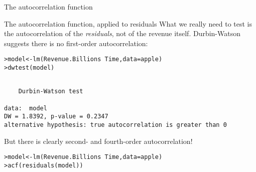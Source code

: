 \documentclass{beamer}\usepackage[]{graphicx}\usepackage[]{color}
\makeatletter
\newcommand{\hlopt}[1]{\textcolor[rgb]{1,0.894,0.769}{#1}}%
\newcommand{\hlstd}[1]{\textcolor[rgb]{1,0.894,0.769}{#1}}%
\newcommand{\hlkwb}[1]{\textcolor[rgb]{0.804,0.776,0.451}{#1}}%
\newcommand{\hlkwc}[1]{\textcolor[rgb]{0.78,0.941,0.545}{#1}}%
\newcommand{\hlkwd}[1]{\textcolor[rgb]{1,0.78,0.769}{#1}}%
\newenvironment{kframe}{%
 \def\at@end@of@kframe{}%
 \ifinner\ifhmode%
  \def\at@end@of@kframe{\end{minipage}}%
  \begin{minipage}{\columnwidth}%
 \fi\fi%
 \def\FrameCommand##1{\hskip\@totalleftmargin \hskip-\fboxsep
 \colorbox{shadecolor}{##1}\hskip-\fboxsep
     \hskip-\linewidth \hskip-\@totalleftmargin \hskip\columnwidth}%
 \MakeFramed {\advance\hsize-\width
   \@totalleftmargin\z@ \linewidth\hsize
   \@setminipage}}%
 {\par\unskip\endMakeFramed%
 \at@end@of@kframe}
\newenvironment{knitrout}{}{} %
\makeatother
\begin{document}
\begin{darkframes}
\begin{frame}[fragile]{The autocorrelation function}
\begin{knitrout}
\end{knitrout}
    \end{frame}



    \begin{frame}[fragile]{The autocorrelation function, applied to residuals}
      \fontsm
      What we really need to test is the autocorrelation of the \emph{residuals}, not of the revenue itself. Durbin-Watson suggests there is no first-order autocorrelation:

\begin{knitrout}
\begin{kframe}
\begin{alltt}
\hlstd{> }\hlstd{model} \hlkwb{<-} \hlkwd{lm}\hlstd{(Revenue.Billions} \hlopt{~} \hlstd{Time,} \hlkwc{data}\hlstd{=apple)}
\hlstd{> }\hlkwd{dwtest}\hlstd{(model)}
\end{alltt}
\begin{verbatim}

	Durbin-Watson test

data:  model
DW = 1.8392, p-value = 0.2347
alternative hypothesis: true autocorrelation is greater than 0
\end{verbatim}
\end{kframe}
\end{knitrout}
    \end{frame}

    \begin{frame}[fragile]

      But there is clearly second- and fourth-order autocorrelation!

\begin{knitrout}
\begin{kframe}
\begin{alltt}
\hlstd{> }\hlstd{model} \hlkwb{<-} \hlkwd{lm}\hlstd{(Revenue.Billions} \hlopt{~} \hlstd{Time,} \hlkwc{data}\hlstd{=apple)}
\hlstd{> }\hlkwd{acf}\hlstd{(}\hlkwd{residuals}\hlstd{(model))}
\end{alltt}
\end{kframe}



\end{knitrout}
\end{frame}
\end{darkframes}
\end{document}
